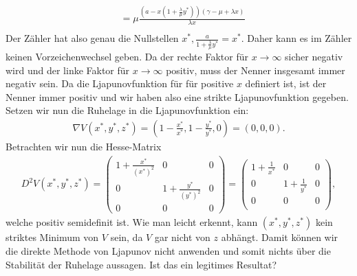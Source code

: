 \begin{solution}
\begin{align*}
  &= \mu \frac{(a-x(1+\frac{\lambda}{\mu} y^*))(\gamma - \mu + \lambda x)}{\lambda x} \\
\end{align*}
Der Zähler hat also genau die Nullstellen $x^*, \frac{a}{1 + \frac{\lambda}{\mu}y^*} = x^*$.
Daher kann es im Zähler keinen Vorzeichenwechsel geben. Da der rechte Faktor für $x \to \infty$ sicher negativ wird
und der linke Faktor für $x \to \infty$ positiv, muss der Nenner insgesamt immer negativ sein.
Da die Ljapunovfunktion für für positive $x$ definiert ist, ist der Nenner immer positiv
und wir haben also eine strikte Ljapunovfunktion gegeben. \\
Setzen wir nun die Ruhelage in die Ljapunovfunktion ein:
\begin{align*}
  \nabla V(x^*,y^*,z^*) = (1 - \frac{x^*}{x^*}, 1 - \frac{y^*}{y^*}, 0) = (0,0,0).
\end{align*}
Betrachten wir nun die Hesse-Matrix
\begin{align*}
  D^2 V(x^*,y^*,z^*) = \begin{pmatrix}
    1 + \frac{x^*}{(x^*)^2} & 0 & 0 \\
    0 & 1 + \frac{y^*}{(y^*)^2} & 0 \\
    0 & 0 & 0
  \end{pmatrix}
  = \begin{pmatrix}
    1 + \frac{1}{x^*} & 0 & 0\\
    0 & 1 + \frac{1}{y^*} & 0 \\
    0 & 0 & 0 \\
  \end{pmatrix},
\end{align*}
welche positiv semidefinit ist. Wie man leicht erkennt, kann $(x^*,y^*,z^*)$ kein
striktes Minimum von $V$ sein, da $V$ gar nicht von $z$ abhängt. Damit können wir
die direkte Methode von Ljapunov nicht anwenden und somit nichts über die Stabilität
der Ruhelage aussagen. Ist das ein legitimes Resultat?
\end{solution}
